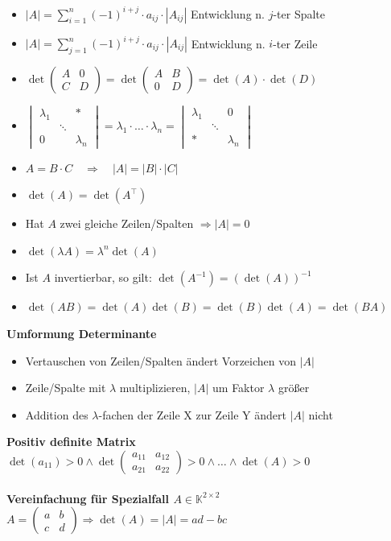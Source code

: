 \documentclass[6pt,a4paper]{scrartcl}
\begin{document}
\begin{multicols*}{4}
\begin{itemize}\itemsep0pt
\item $|A|=\sum\limits_{i=1}^n (-1)^{i+j} \cdot a_{ij} \cdot |A_{ij}|$ \qquad Entwicklung n. $j$-ter Spalte
\item $|A|=\sum\limits_{j=1}^n (-1)^{i+j} \cdot a_{ij} \cdot |A_{ij}|$ \qquad Entwicklung n. $i$-ter Zeile
\item $\det\begin{pmatrix}A&0\\C&D\end{pmatrix}=\det\begin{pmatrix}A&B\\0&D\end{pmatrix}=\det(A)\cdot\det(D)$
\item $\begin{vmatrix}\lambda_1&&* \\ &\ddots& \\ 0&&\lambda_n \end{vmatrix} = \lambda_1\cdot \ldots\cdot \lambda_n = \begin{vmatrix} \lambda_1&&0  \\  &\ddots& \\  *&&\lambda_n \end{vmatrix}$
\item $A=B \cdot C \quad \Rightarrow \quad |A|=|B| \cdot |C|$
\item $\det(A)=\det(A^\top)$
\item Hat $A$ zwei gleiche Zeilen/Spalten $\Rightarrow |A|=0$
\item $\det(\lambda A)=\lambda^n \det(A)$
\item Ist $A$ invertierbar, so gilt: $\det(A^{-1})=(\det(A))^{-1}$
\item $\det(AB) = \det(A) \det(B) = \det(B) \det(A) = \det(BA)$
\end{itemize}
\textbf{Umformung Determinante}
\begin{itemize}\itemsep0pt
\item Vertauschen von Zeilen/Spalten ändert Vorzeichen von $|A|$
\item Zeile/Spalte mit $\lambda$ multiplizieren, $|A|$ um Faktor $\lambda$ größer
\item Addition des $\lambda$-fachen der Zeile X zur Zeile Y ändert $|A|$ nicht 
\end{itemize}
\textbf{Positiv definite Matrix}\\
$\det (a_{11}) > 0 \land \det \left(\begin{matrix} a_{11} & a_{12}\\ a_{21} & a_{22}\end{matrix}\right) > 0 \land \dotsc \land \det (A)>0$   \\ \\
\textbf{Vereinfachung für Spezialfall $A\in \mathbb K^{2\times 2}$}\\
$A=\begin{pmatrix}a&b\\c&d\end{pmatrix} \Rightarrow \det(A)=|A|=ad-bc$


\end{multicols*}
\end{document}
